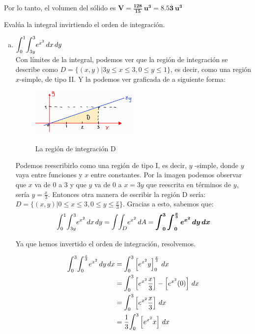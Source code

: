 \documentclass[12pt]{exam}
\begin{document}
\begin{questions}
\begin{enumerate}[a)]
  Por lo tanto, el volumen del sólido es $ \boldsymbol{V = \frac{128}{15} ~u^3 = 8.5\overline{3} ~u^3} $
     \end{enumerate}
     
     \question
     Evalúa la integral invirtiendo el orden de integración.
     \begin{enumerate}[a)]
     \item $\mathlarger{\int}_0^1\mathlarger{\int}_{3y}^3 e^{x^2}\,dx\,dy$ \\
       Con límites de la integral, podemos ver que la región de integración se describe como $D = \{ (x,y)| 3y \leq x \leq 3, 0 \leq y \leq 1 \}$, es decir, como una región $x$-simple, de tipo II. Y la podemos ver graficada de a siguiente forma:
       

        \begin{figure}[H]
      \centering
      \includegraphics[width=0.5\textwidth]{./img/i1e6.png}
      \label{fig:región}
      \caption{La región de integración D}
        \end{figure}

 Podemos reescribirlo como una región de tipo I, es decir, $y$ -simple, donde $y$ vaya entre funciones y $x$ entre constantes. Por la imagen podemos observar que $x$ va de 0 a 3 y que $y$ va de 0 a $x=3y$ que reescrita en términos de $y$, sería $y= \frac{x}{3}$. Entonces otra manera de escribir la región D sería: $D= \{(x,y)| 0 \leq x \leq 3, 0 \leq y \leq \frac{x}{3} \}$. Gracias a esto, sabemos que:\\
        \[
        \mathlarger{\int}_0^1\mathlarger{\int}_{3y}^3 e^{x^2}\,dx\,dy = \mathlarger{\int}\mathlarger{\int_D}  e^{x^2} \,dA  = \boldsymbol{ \int_0^3\int_{0}^{\frac{x}{3}} e^{x^2}\,dy\,dx}
        \]

 Ya que hemos invertido el orden de integración, resolvemos.

 \begin{align*}
   \mathlarger{\int}_0^3\mathlarger{\int}_{0}^{\frac{x}{3}} e^{x^2}\,dy\,dx
   &= \mathlarger{\int}_0^3\left[  e^{x^2} y \right]_{0}^{\frac{x}{3}} \,dx \\
   &= \mathlarger{\int}_0^3\left[  e^{x^2} \frac{x}{3} \right] - \left[  e^{x^2} (0) \right] \,dx \\
   &= \mathlarger{\int}_0^3\left[  e^{x^2} \frac{x}{3} \right] \,dx \\
   &= \frac{1}{3} \mathlarger{\int}_0^3\left[  e^{x^2}x  \right] \,dx \\
 \end{align*}


\end{enumerate}
\end{questions}
\end{document}
